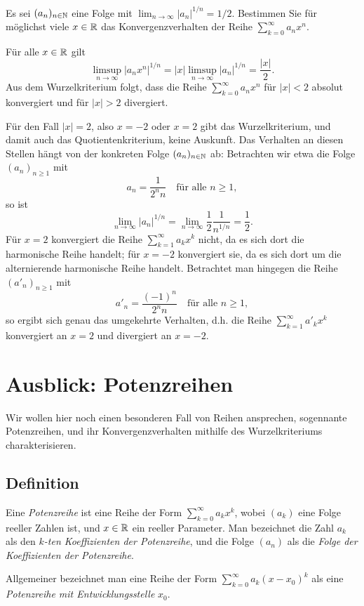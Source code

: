 \documentclass[a4paper,10pt]{article}
\begin{document}
\begin{question}\label{qst: Konvergenzradius}
Es sei $(a_n)_{n \in \mathbb{N}}$ eine Folge mit $\lim_{n \to \infty} |a_n|^{1/n} = 1/2$. Bestimmen Sie für möglichst viele $x \in \mathbb{R}$ das Konvergenzverhalten der Reihe $\sum_{k=0}^\infty a_n x^n$.
\end{question}
\begin{solution}
 Für alle $x \in \mathbb{R}$ gilt
 \[
  \limsup_{n \to \infty} |a_n x^n|^{1/n}
  = |x| \limsup_{n \to \infty} |a_n|^{1/n}
  = \frac{|x|}{2}.
 \]
 Aus dem Wurzelkriterium folgt, dass die Reihe $\sum_{k=0}^\infty a_n x^n$ für $|x| < 2$ absolut konvergiert und für $|x| > 2$ divergiert.
 
 Für den Fall $|x| = 2$, also $x = -2$ oder $x = 2$ gibt das Wurzelkriterium, und damit auch das Quotientenkriterium, keine Auskunft. Das Verhalten an diesen Stellen hängt von der konkreten Folge $(a_n)_{n \in \mathbb{N}}$ ab: Betrachten wir etwa die Folge $(a_n)_{n \geq 1}$ mit
 \[
  a_n = \frac{1}{2^n n} \quad \text{für alle $n \geq 1$},
 \]
 so ist
 \[
  \lim_{n \to \infty} |a_n|^{1/n}
  = \lim_{n \to \infty} \frac{1}{2} \frac{1}{n^{1/n}}
  = \frac{1}{2}.
 \]
 Für $x = 2$ konvergiert die Reihe $\sum_{k=1}^\infty a_k x^k$ nicht, da es sich dort die harmonische Reihe handelt; für $x = -2$ konvergiert sie, da es sich dort um die alternierende harmonische Reihe handelt. Betrachtet man hingegen die Reihe $(a'_n)_{n \geq 1}$ mit
 \[
  a'_n = \frac{(-1)^n}{2^n n} \quad \text{für alle $n \geq 1$},
 \]
 so ergibt sich genau das umgekehrte Verhalten, d.h. die Reihe $\sum_{k=1}^\infty a'_k x^k$ konvergiert an $x = 2$ und divergiert an $x = -2$.
\end{solution}




\section{Ausblick: Potenzreihen}
Wir wollen hier noch einen besonderen Fall von Reihen ansprechen, sogennante Potenzreihen, und ihr Konvergenzverhalten mithilfe des Wurzelkriteriums charakterisieren.


\subsection{Definition}
\begin{defi}
 Eine \emph{Potenzreihe} ist eine Reihe der Form $\sum_{k=0}^\infty a_k x^k$, wobei $(a_k)$ eine Folge reeller Zahlen ist, und $x \in \mathbb{R}$ ein reeller Parameter. Man bezeichnet die Zahl $a_k$ als den \emph{$k$-ten Koeffizienten der Potenzreihe}, und die Folge $(a_n)$ als die \emph{Folge der Koeffizienten der Potenzreihe}.
 
 Allgemeiner bezeichnet man eine Reihe der Form $\sum_{k=0}^\infty a_k (x-x_0)^k$ als eine \emph{Potenzreihe mit Entwicklungsstelle} $x_0$.
\end{defi}
\end{document}
